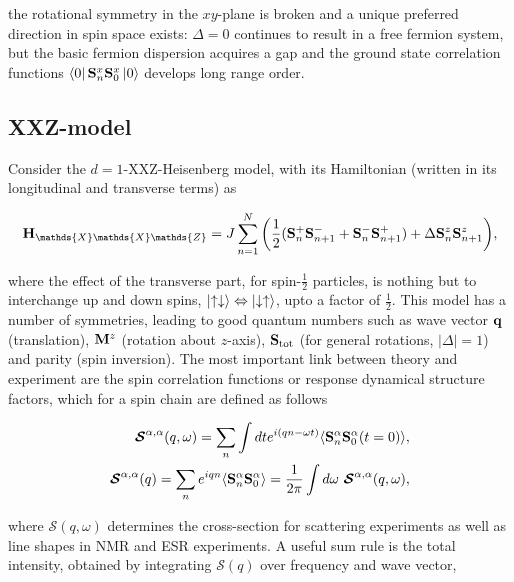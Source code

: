 \documentclass{homework}
\begin{document}
the rotational symmetry in the $xy$-plane is broken and a unique preferred direction in spin space exists: $\Delta = 0$ continues to result in a free fermion system, but the basic fermion dispersion acquires a gap and the ground state correlation functions $\bra{0}{{\bf S}}_n^x{{\bf S}}_0^x\ket{0}$
develops long range order. \\

\subsection{XXZ-model}

Consider the $d=1$-XXZ-Heisenberg model, with its Hamiltonian (written in its longitudinal and transverse terms) as 

\begin{equation}
    \Hamiltonian_{\mathds{X}\mathds{X}\mathds{Z}} = J \sum_{n=1}^{N} \bigg( \frac{1}{2} (\spin^{+}_{n} \spin^{-}_{n+1} + \spin^{-}_{n} \spin^{+}_{n+1}) + \Delta \spin^{z}_{n} \spin_{n+1}^{z} \bigg),
\end{equation}

where the effect of the transverse part, for spin-$\frac{1}{2}$ particles, is nothing but to interchange up and down spins, $\ket{\uparrow\downarrow} \Leftrightarrow \ket{\downarrow\uparrow}$, upto a factor of $\frac{1}{2}$. This model has a number of symmetries, leading to good quantum numbers such as wave vector ${\bf q}$ (translation), ${\bf M}^z$ (rotation about $z$-axis), ${\bf S}_{\textnormal{tot}}$ (for general rotations, $|\Delta| = 1$) and parity (spin inversion). The most important link between theory and experiment are the spin correlation functions or response dynamical structure factors, which for a spin chain are defined as follows

\begin{equation}
    \begin{split}
        \bm{\mathcal S}^{\alpha, \alpha}(q, \omega) = \sum_{n} \int dt e^{i(qn-\omega t)} \langle {\bf S}_n^{\alpha} {\bf S}_{0}^{\alpha}(t=0) \rangle, \\
        \bm{\mathcal S}^{\alpha, \alpha}(q) = \sum_{n} e^{iqn} \langle {\bf S}_n^{\alpha} {\bf S}_{0}^{\alpha} \rangle = \frac{1}{2\pi} \int d\omega \textnormal{ } \bm{\mathcal S}^{\alpha, \alpha}(q, \omega),
    \end{split}
\end{equation}

where $\bm{\mathcal S}(q, \omega)$ determines the cross-section for scattering experiments as well as line shapes in NMR and ESR experiments. A useful sum rule is the total intensity, obtained by integrating $\bm{\mathcal S}(q)$ over frequency and wave vector, 
\end{document}
